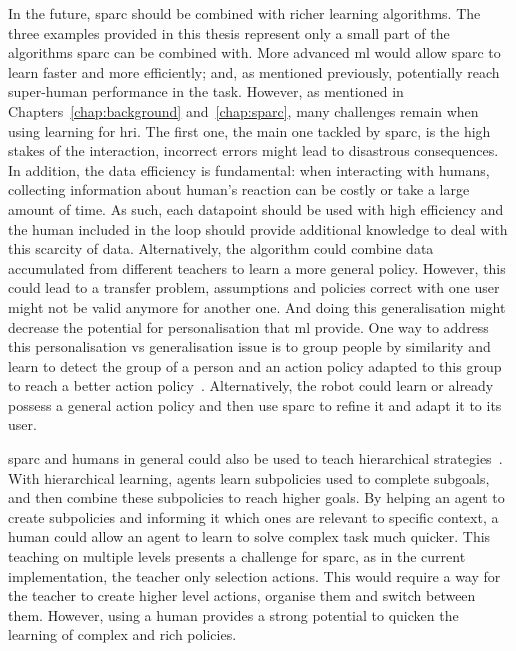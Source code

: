 In the future, \gls{sparc} should be combined with richer learning algorithms. The three examples provided in this thesis represent only a small part of the algorithms \gls{sparc} can be combined with. More advanced \gls{ml} would allow \gls{sparc} to learn faster and more efficiently; and, as mentioned previously, potentially reach super-human performance in the task. However, as mentioned in Chapters~\ref{chap:background} and~\ref{chap:sparc}, many challenges remain when using learning for \gls{hri}. The first one, the main one tackled by \gls{sparc}, is the high stakes of the interaction, incorrect errors might lead to disastrous consequences. In addition, the data efficiency is fundamental: when interacting with humans, collecting information about human's reaction can be costly or take a large amount of time. As such, each datapoint should be used with high efficiency and the human included in the loop should provide additional knowledge to deal with this scarcity of data. Alternatively, the algorithm could combine data accumulated from different teachers to learn a more general policy. However, this could lead to a transfer problem, assumptions and policies correct with one user might not be valid anymore for another one. And doing this generalisation might decrease the potential for personalisation that \gls{ml} provide. One way to address this personalisation vs generalisation issue is to group people by similarity and learn to detect the group of a person and an action policy adapted to this group to reach a better action policy~\citep{brunskill2014pac}. Alternatively, the robot could learn or already possess a general action policy and then use \gls{sparc} to refine it and adapt it to its user. 

\gls{sparc} and humans in general could also be used to teach hierarchical strategies~\citep{botvinick2012hierarchical}. With hierarchical learning, agents learn subpolicies used to complete subgoals, and then combine these subpolicies to reach higher goals. By helping an agent to create subpolicies and informing it which ones are relevant to specific context, a human could allow an agent to learn to solve complex task much quicker. This teaching on multiple levels presents a challenge for \gls{sparc}, as in the current implementation, the teacher only selection actions. This would require a way for the teacher to create higher level actions, organise them and switch between them. However, using a human provides a strong potential to quicken the learning of complex and rich policies.

